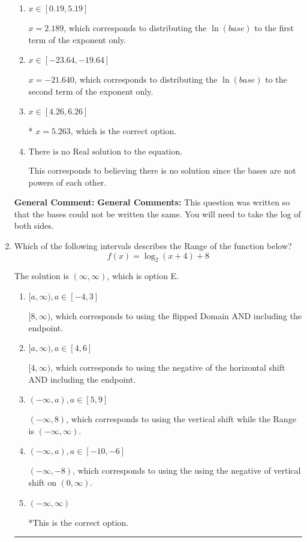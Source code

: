 \documentclass{extbook}[14pt]
\newcommand{\litem}[1]{\item #1

\rule{\textwidth}{0.4pt}}
\begin{document}
\begin{enumerate}
{\begin{enumerate}[label=\Alph*.]
$x = -9.000$, which corresponds to solving the numerators as equal while ignoring the bases are different.
\item \( x \in [0.19, 5.19] \)

$x = 2.189$, which corresponds to distributing the $\ln(base)$ to the first term of the exponent only.
\item \( x \in [-23.64, -19.64] \)

$x = -21.640$, which corresponds to distributing the $\ln(base)$ to the second term of the exponent only.
\item \( x \in [4.26, 6.26] \)

* $x = 5.263$, which is the correct option.
\item \( \text{There is no Real solution to the equation.} \)

This corresponds to believing there is no solution since the bases are not powers of each other.
\end{enumerate}

\textbf{General Comment:} \textbf{General Comments:} This question was written so that the bases could not be written the same. You will need to take the log of both sides.
}
\litem{
Which of the following intervals describes the Range of the function below?
\[ f(x) = \log_2{(x+4)}+8 \]

The solution is \( (\infty, \infty) \), which is option E.\begin{enumerate}[label=\Alph*.]
\item \( [a, \infty), a \in [-4, 3] \)

$[8, \infty)$, which corresponds to using the flipped Domain AND including the endpoint.
\item \( [a, \infty), a \in [4, 6] \)

$[4, \infty)$, which corresponds to using the negative of the horizontal shift AND including the endpoint.
\item \( (-\infty, a), a \in [5, 9] \)

$(-\infty, 8)$, which corresponds to using the vertical shift while the Range is $(-\infty, \infty)$.
\item \( (-\infty, a), a \in [-10, -6] \)

$(-\infty, -8)$, which corresponds to using the using the negative of vertical shift on $(0, \infty)$.
\item \( (-\infty, \infty) \)

*This is the correct option.
\end{enumerate}

}
\end{enumerate}
\end{document}
